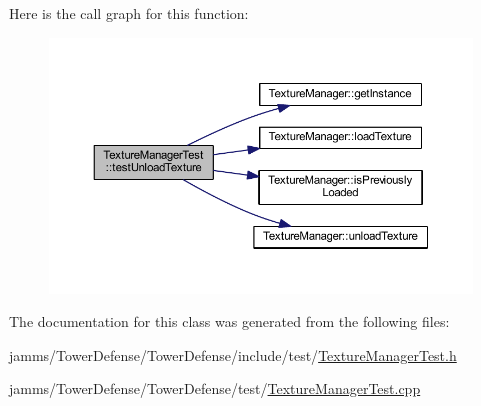 Here is the call graph for this function\+:
\nopagebreak
\begin{figure}[H]
\begin{center}
\leavevmode
\includegraphics[width=350pt]{class_texture_manager_test_adcea36cb8961f391b772da37416a3c76_cgraph}
\end{center}
\end{figure}




The documentation for this class was generated from the following files\+:\begin{DoxyCompactItemize}
\item 
jamms/\+Tower\+Defense/\+Tower\+Defense/include/test/\hyperlink{_texture_manager_test_8h}{Texture\+Manager\+Test.\+h}\item 
jamms/\+Tower\+Defense/\+Tower\+Defense/test/\hyperlink{_texture_manager_test_8cpp}{Texture\+Manager\+Test.\+cpp}\end{DoxyCompactItemize}

